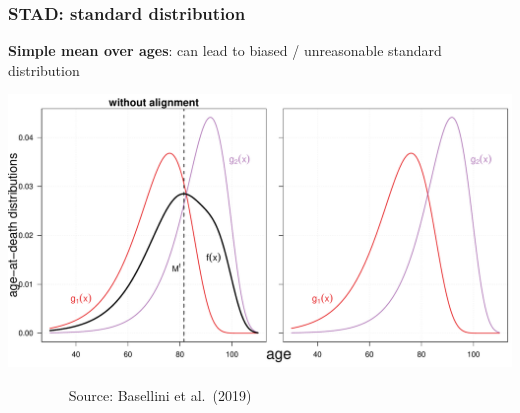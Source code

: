 \documentclass[12pt, xcolor=table]{beamer}  %
\begin{document}
\begin{frame}[noframenumbering]\frametitle{STAD: standard distribution}

\vspace{-0.3cm}
	
	\begin{center}
		
		\textbf{Simple mean over ages}: can lead to biased / unreasonable standard distribution 
		
		\vspace{0.3cm}
		
		\includegraphics[scale=.35]{Figures/Ch2/F8_2.pdf}
		
	\end{center}

\vspace{-0.15cm}
\scriptsize{$\quad\quad\quad\quad$ Source: Basellini et al.~(2019)}
	
	
\end{frame}	
\end{document}
